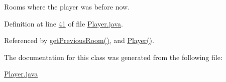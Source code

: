 Rooms where the player was before now. 



Definition at line \hyperlink{Player_8java_source_l00041}{41} of file \hyperlink{Player_8java_source}{Player.\-java}.



Referenced by \hyperlink{Player_8java_source_l00105}{get\-Previous\-Room()}, and \hyperlink{Player_8java_source_l00053}{Player()}.



The documentation for this class was generated from the following file\-:\begin{DoxyCompactItemize}
\item 
\hyperlink{Player_8java}{Player.\-java}\end{DoxyCompactItemize}
